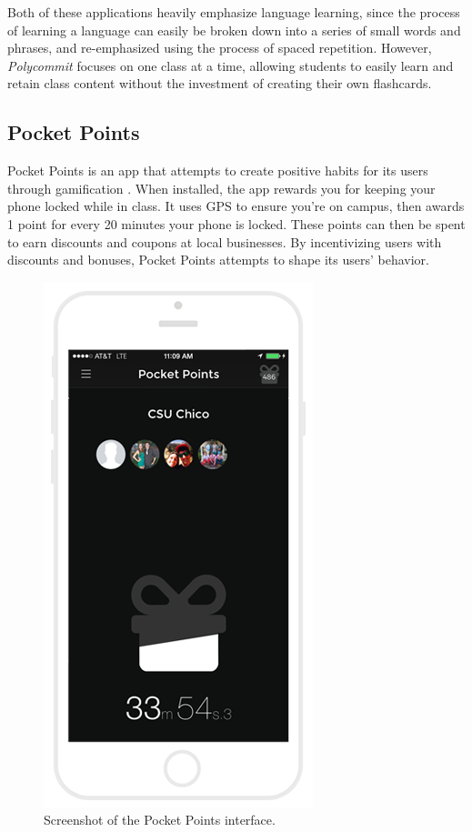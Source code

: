 \par Both of these applications heavily emphasize language learning, since the process of learning a language can easily be broken down into a series of small words and phrases, and re-emphasized using the process of spaced repetition. However, \textit{Polycommit} focuses on one class at a time, allowing students to easily learn and retain class content without the investment of creating their own flashcards.



\subsection{Pocket Points}
\par Pocket Points is an app that attempts to create positive habits for its users through gamification \cite{pocketpoints}. When installed, the app rewards you for keeping your phone locked while in class. It uses GPS to ensure you're on campus, then awards 1 point for every 20 minutes your phone is locked. These points can then be spent to earn discounts and coupons at local businesses. By incentivizing users with discounts and bonuses, Pocket Points attempts to shape its users' behavior.


\begin{figure}
	\centering
	\includegraphics[width=0.7\linewidth]{figures/pocket-points}
	\caption{Screenshot of the Pocket Points interface.}
	\label{fig:pocket-points}
\end{figure}


